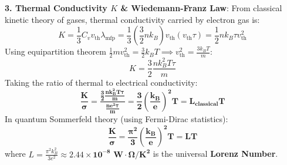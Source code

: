 \begin{theorysol}
\textbf{3. Thermal Conductivity $K$ \& Wiedemann-Franz Law}:
From classical kinetic theory of gases, thermal conductivity carried by electron gas is:
\begin{equation}
K = \frac{1}{3} C_v v_{\text{th}} \lambda_{\text{mfp}} = \frac{1}{3}\left(\frac{3}{2}n k_B\right) v_{\text{th}} (v_{\text{th}}\tau) = \frac{1}{2} n k_B \tau v_{\text{th}}^2
\end{equation}
Using equipartition theorem $\frac{1}{2}m v_{\text{th}}^2 = \frac{3}{2}k_BT \implies v_{\text{th}}^2 = \frac{3k_BT}{m}$:
\begin{equation}
K = \frac{3}{2}\frac{n k_B^2 T \tau}{m}
\end{equation}
Taking the ratio of thermal to electrical conductivity:
\begin{equation}
\mathbf{\frac{K}{\sigma} = \frac{\frac{3}{2}\frac{n k_B^2 T \tau}{m}}{\frac{n e^2 \tau}{m}} = \frac{3}{2}\left(\frac{k_B}{e}\right)^2 T = L_{\text{classical}} T}
\end{equation}
In quantum Sommerfeld theory (using Fermi-Dirac statistics):
\begin{equation}
\mathbf{\frac{K}{\sigma} = \frac{\pi^2}{3}\left(\frac{k_B}{e}\right)^2 T = L T}
\end{equation}
where $L = \frac{\pi^2 k_B^2}{3e^2} \approx \mathbf{2.44 \times 10^{-8}\text{ W}\cdot\Omega/\text{K}^2}$ is the universal \textbf{Lorenz Number}.
\end{theorysol}
\vspace{4mm}

